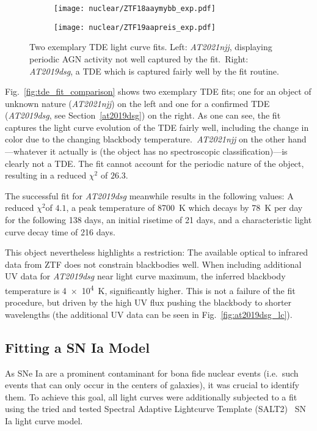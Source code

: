 \begin{figure}[htb]
  \centering
  \begin{subfigure}[b]{0.49\textwidth}
    \centering
    \texttt{[image: nuclear/ZTF18aaymybb\_exp.pdf]}
  \end{subfigure}
  \begin{subfigure}[b]{0.49\textwidth}
    \centering
    \texttt{[image: nuclear/ZTF19aapreis\_exp.pdf]}
  \end{subfigure}
  \caption[Two exemplary TDE fits]{Two exemplary TDE light curve fits. Left: \textit{AT2021njj}, displaying periodic AGN activity not well captured by the fit.\ Right: \textit{AT2019dsg}, a TDE which is captured fairly well by the fit routine.}
\end{figure}

Fig.~\ref{fig:tde_fit_comparison} shows two exemplary TDE fits; one for an object of unknown nature (\textit{AT2021njj}) on the left and one for a confirmed TDE (\textit{AT2019dsg}, see Section~\ref{at2019dsg}) on the right. As one can see, the fit captures the light curve evolution of the TDE fairly well, including the change in color due to the changing blackbody temperature.~\textit{AT2021njj} on the other hand---whatever it actually is (the object has no spectroscopic classification)---is clearly not a TDE. The fit cannot account for the periodic nature of the object, resulting in a reduced $\chi^2$ of $26.3$.

The successful fit for \textit{AT2019dsg} meanwhile results in the following values: A reduced $\chi^2$of $4.1$, a peak temperature of \SI{8700}{\K} which decays by \SI{78}{\K} per day for the following 138 days, an initial risetime of 21 days, and a characteristic light curve decay time of 216 days.

This object nevertheless highlights a restriction: The available optical to infrared data from ZTF does not constrain blackbodies well. When including additional UV data for \textit{AT2019dsg} near light curve maximum, the inferred blackbody temperature is \SI{4e4}{\K}, significantly higher. This is not a failure of the fit procedure, but driven by the high UV flux pushing the blackbody to shorter wavelengths (the additional UV data can be seen in Fig.~\ref{fig:at2019dsg_lc}).

\subsection{Fitting a SN Ia Model}\label{salt}
As SNe Ia are a prominent contaminant for bona fide nuclear events (i.e.~such events that can only occur in the centers of galaxies), it was crucial to identify them. To achieve this goal, all light curves were additionally subjected to a fit using the tried and tested Spectral Adaptive Lightcurve Template (SALT2)~ SN Ia light curve model.

